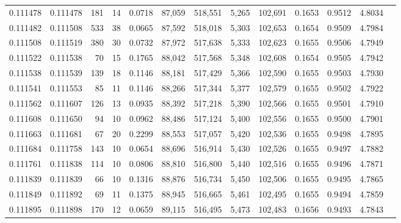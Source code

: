 \begin{tabular}{rrrrrrrrrrrrr}
0.111478 & 0.111478 &   181 &  14 &                                     0.0718 &  87,059 & 518,551 &   5,265 & 102,691 & 0.1653 & 0.9512 & 4.8034 \\
0.111482 & 0.111508 &   533 &  38 &                                     0.0665 &  87,592 & 518,018 &   5,303 & 102,653 & 0.1654 & 0.9509 & 4.7984 \\
0.111508 & 0.111519 &   380 &  30 &                                     0.0732 &  87,972 & 517,638 &   5,333 & 102,623 & 0.1655 & 0.9506 & 4.7949 \\
0.111522 & 0.111538 &    70 &  15 &                                     0.1765 &  88,042 & 517,568 &   5,348 & 102,608 & 0.1654 & 0.9505 & 4.7942 \\
0.111538 & 0.111539 &   139 &  18 &                                     0.1146 &  88,181 & 517,429 &   5,366 & 102,590 & 0.1655 & 0.9503 & 4.7930 \\
0.111541 & 0.111553 &    85 &  11 &                                     0.1146 &  88,266 & 517,344 &   5,377 & 102,579 & 0.1655 & 0.9502 & 4.7922 \\
0.111562 & 0.111607 &   126 &  13 &                                     0.0935 &  88,392 & 517,218 &   5,390 & 102,566 & 0.1655 & 0.9501 & 4.7910 \\
0.111608 & 0.111650 &    94 &  10 &                                     0.0962 &  88,486 & 517,124 &   5,400 & 102,556 & 0.1655 & 0.9500 & 4.7901 \\
0.111663 & 0.111681 &    67 &  20 &                                     0.2299 &  88,553 & 517,057 &   5,420 & 102,536 & 0.1655 & 0.9498 & 4.7895 \\
0.111684 & 0.111758 &   143 &  10 &                                     0.0654 &  88,696 & 516,914 &   5,430 & 102,526 & 0.1655 & 0.9497 & 4.7882 \\
0.111761 & 0.111838 &   114 &  10 &                                     0.0806 &  88,810 & 516,800 &   5,440 & 102,516 & 0.1655 & 0.9496 & 4.7871 \\
0.111839 & 0.111839 &    66 &  10 &                                     0.1316 &  88,876 & 516,734 &   5,450 & 102,506 & 0.1655 & 0.9495 & 4.7865 \\
0.111849 & 0.111892 &    69 &  11 &                                     0.1375 &  88,945 & 516,665 &   5,461 & 102,495 & 0.1655 & 0.9494 & 4.7859 \\
0.111895 & 0.111898 &   170 &  12 &                                     0.0659 &  89,115 & 516,495 &   5,473 & 102,483 & 0.1656 & 0.9493 & 4.7843 \\

\end{tabular}
